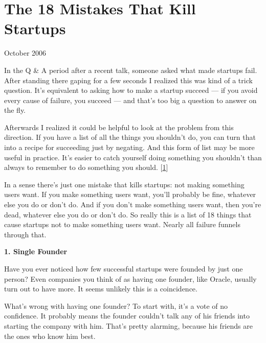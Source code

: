 \chapter{The 18 Mistakes That Kill Startups}


            
              
                


                  
                    October 2006

In the Q \& A period after a recent
                    talk, someone asked what made startups fail. After standing
                    there gaping for a few seconds I realized this was kind of a
                    trick question. It's equivalent to asking how to make a
                    startup succeed --- if you avoid every cause of failure,
                    you succeed --- and that's too big a question to answer
                    on the fly.

Afterwards I realized it could be
                    helpful to look at the problem from this direction. If you
                    have a list of all the things you shouldn't do, you can turn
                    that into a recipe for succeeding just by negating. And this
                    form of list may be more useful in practice. It's easier to
                    catch yourself doing something you shouldn't than always to
                    remember to do something you should.
                    [\href{\#f1n}{1}]

In a sense there's just one mistake that kills
                    startups: not making something users want. If you make
                    something users want, you'll probably be fine, whatever else
                    you do or don't do. And if you don't make something users
                    want, then you're dead, whatever else you do or don't do. So
                    really this is a list of 18 things that cause startups not
                    to make something users want. Nearly all failure funnels
                    through that.

\textbf{1. Single Founder}

Have you ever noticed how few successful
                    startups were founded by just one person? Even companies you
                    think of as having one founder, like Oracle, usually turn
                    out to have more. It seems unlikely this is a
                    coincidence.

What's wrong with having one
                    founder? To start with, it's a vote of no confidence. It
                    probably means the founder couldn't talk any of his friends
                    into starting the company with him. That's pretty alarming,
                    because his friends are the ones who know him best.

